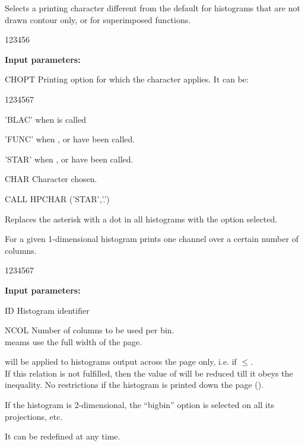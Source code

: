 \Action
Selects a printing character different from the default for
histograms that are
not drawn contour only, or for superimposed functions.
 
\begin{DLtt}{123456}
\item[{\rm\bf Input parameters:}]
\item[CHOPT] Printing option for which the character
applies. It can be:
\begin{DLtt}{1234567}
\item['BLAC'] when  is called
\item['FUNC'] when ,  or
 have been called.
\item['STAR'] when ,  or
 have been called.
\end{DLtt}
\item[CHAR] Character chosen.
\end{DLtt}
 
\Example
\begin{XMP}
CALL HPCHAR ('STAR','.')
\end{XMP}
Replaces the asterisk with a dot
in all histograms with the 
option selected.
 
 
\Action
For a given 1-dimensional histogram
prints one channel over a certain number of columns.
 
\begin{DLtt}{1234567}
\item[{\rm\bf Input parameters:}]
\item[ID] Histogram identifier
\item[NCOL] Number of columns to be used per bin.\\
 meams use the full width of the page.
\end{DLtt}
 
\Remark
 
\begin{UL}
\item {}
will be applied to histograms output across the page
only, i.e. if \(\leq\).\\
If this relation is not fulfilled, then the value of 
will be reduced till it obeys the inequality.
No restrictions if the histogram is
printed down the page ().
\item
If the histogram is
2-dimensional, the ``bigbin'' option is selected on all its
projections, etc.
\item
It can be redefined at any time.
\end{UL}
 
